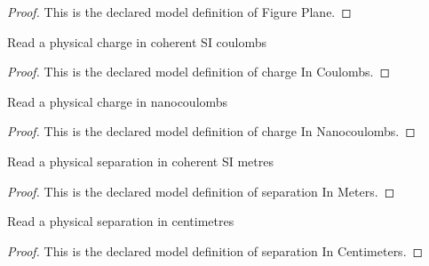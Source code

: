 \begin{proof}
  This is the declared model definition of Figure Plane.
\end{proof}
\begin{definition}
  \label{def:physics:phyx-mini-0855:phyxminiproblems-problemphyxmini0855-chargeincoulombs}
  Read a physical charge in coherent SI coulombs
\end{definition}
\begin{proof}
  This is the declared model definition of charge In Coulombs.
\end{proof}
\begin{definition}
  \label{def:physics:phyx-mini-0855:phyxminiproblems-problemphyxmini0855-chargeinnanocoulombs}
  Read a physical charge in nanocoulombs
\end{definition}
\begin{proof}
  This is the declared model definition of charge In Nanocoulombs.
\end{proof}
\begin{definition}
  \label{def:physics:phyx-mini-0855:phyxminiproblems-problemphyxmini0855-separationinmeters}
  Read a physical separation in coherent SI metres
\end{definition}
\begin{proof}
  This is the declared model definition of separation In Meters.
\end{proof}
\begin{definition}
  \label{def:physics:phyx-mini-0855:phyxminiproblems-problemphyxmini0855-separationincentimeters}
  Read a physical separation in centimetres
\end{definition}
\begin{proof}
  This is the declared model definition of separation In Centimeters.
\end{proof}
